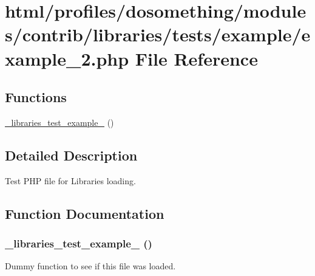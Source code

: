 \hypertarget{example__2_8php}{
\section{html/profiles/dosomething/modules/contrib/libraries/tests/example/example\_\-2.php File Reference}
\label{example__2_8php}
}
\subsection*{Functions}
\begin{DoxyCompactItemize}
\item 
\hyperlink{example__2_8php_a50d2eac5ffcbed5f51bfa6817f8b9f47}{\_\-libraries\_\-test\_\-example\_} ()
\end{DoxyCompactItemize}


\subsection{Detailed Description}
Test PHP file for Libraries loading. 

\subsection{Function Documentation}
\hypertarget{example__2_8php_a50d2eac5ffcbed5f51bfa6817f8b9f47}{
\subsubsection[{\_\-libraries\_\-test\_\-example\_\-2}]{\setlength{\rightskip}{0pt plus 5cm}\_\-libraries\_\-test\_\-example\_ ()}}
\label{example__2_8php_a50d2eac5ffcbed5f51bfa6817f8b9f47}
Dummy function to see if this file was loaded. 